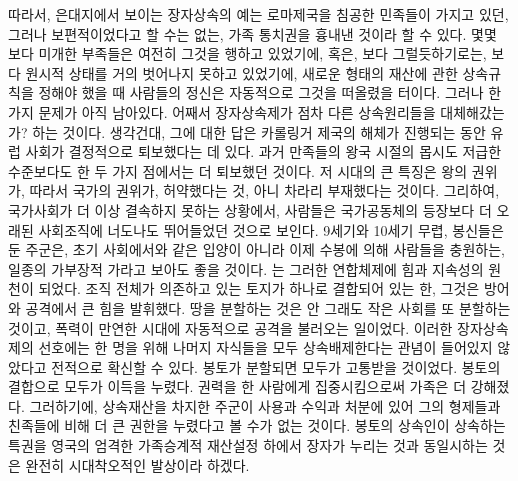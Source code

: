 따라서,
은대지에서 보이는 장자상속의 예는
로마제국을 침공한 민족들이 가지고 있던, 그러나 보편적이었다고 할 수는 없는,
가족 통치권을 흉내낸 것이라 할 수 있다.
몇몇 보다 미개한 부족들은 여전히 그것을 행하고 있었기에,
혹은, 보다 그럴듯하기로는, 보다 원시적 상태를 거의 벗어나지 못하고 있었기에,
새로운 형태의 재산에 관한 상속규칙을 정해야 했을 때
사람들의 정신은 자동적으로 그것을 떠올렸을 터이다.
그러나 한 가지 문제가 아직 남아있다.
어째서 장자상속제가 점차 다른 상속원리들을 대체해갔는가? 하는 것이다.
생각건대, 그에 대한 답은
카롤링거 제국의 해체가 진행되는 동안 유럽 사회가 결정적으로 퇴보했다는 데 있다.
과거 만족들의 왕국 시절의
몹시도 저급한 수준보다도 한 두 가지 점에서는 더 퇴보했던 것이다.
저 시대의 큰 특징은 왕의 권위가, 따라서 국가의 권위가,
허약했다는 것, 아니 차라리 부재했다는 것이다.
그리하여, 국가사회가 더 이상 결속하지 못하는 상황에서,
사람들은
국가공동체의 등장보다 더 오래된 사회조직에
너도나도 뛰어들었던 것으로 보인다.
9세기와 10세기 무렵, 봉신들은 둔 주군은,
초기 사회에서와 같은 입양이 아니라
이제 수봉에 의해 사람들을 충원하는,
일종의 가부장적 가라고 보아도 좋을 것이다.
는
그러한 연합체제에
힘과 지속성의 원천이 되었다.
조직 전체가 의존하고 있는 토지가 하나로 결합되어 있는 한,
그것은 방어와 공격에서 큰 힘을 발휘했다.
땅을 분할하는 것은 안 그래도 작은 사회를 또 분할하는 것이고,
폭력이 만연한 시대에 자동적으로 공격을 불러오는 일이었다.
이러한 장자상속제의 선호에는
한 명을 위해 나머지 자식들을 모두 상속배제한다는 관념이
들어있지 않았다고
전적으로 확신할 수 있다.
봉토가 분할되면 모두가 고통받을 것이었다.
봉토의 결합으로 모두가 이득을 누렸다.
권력을 한 사람에게 집중시킴으로써 가족은 더 강해졌다.
그러하기에, 상속재산을 차지한 주군이
사용과 수익과 처분에 있어
그의 형제들과 친족들에 비해
더 큰 권한을 누렸다고 볼 수가 없는 것이다.
봉토의 상속인이 상속하는 특권을
영국의 엄격한 가족승계적 재산설정 하에서 장자가 누리는 것과
동일시하는 것은 완전히 시대착오적인 발상이라 하겠다.

